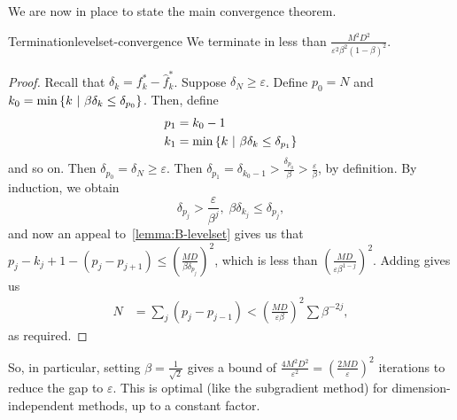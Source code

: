 We are now in place to state the main convergence theorem.
\begin{ctheorem}{Termination}{levelset-convergence}
	We terminate in less than $\frac{M^2 D^2}{\varepsilon^2 \beta^2 (1 -
	\beta)^2}$.
\end{ctheorem}
\begin{proof}
	Recall that $\delta_k = f_k^* - \hat{f}_k^*$.
	Suppose $\delta_N \geq \varepsilon$. Define $p_0 = N$ and
	$k_0 = \min\left\{ k \ \middle| \  \beta \delta_k \leq \delta_{p_0} \right\}$. Then, define
	\begin{align*}
		p_1 &= k_0 - 1 \\
		k_1 &= \min\left\{ k \ \middle| \  \beta \delta_k \leq \delta_{p_1} \right\}
	\end{align*}
	and so on. Then $\delta_{p_0} = \delta_N \geq \varepsilon$. Then
	$\delta_{p_1} = \delta_{k_0 - 1} > \frac{\delta_{p_0}}{\beta} >
	\frac{\varepsilon}{\beta}$, by definition. By induction, we obtain
	\[
		\delta_{p_j} > \frac{\varepsilon}{\beta^j}, \;
		\beta \delta_{k_j} \leq \delta_{p_j},
	\]
	and now an appeal to~\cref{lemma:B-levelset} gives us that
	$p_j - k_j + 1 - (p_j - p_{j+1}) \leq \left(\frac{M D}{\beta
			\delta_{p_j}}\right)^2$, which is less than $\left( \frac{MD}{\varepsilon
	\beta^{1-j}} \right)^2$. Adding gives us
	\begin{align*}
		N &= \sum_j \left(p_j - p_{j-1}\right) <
		\left(\frac{MD}{\varepsilon\beta}\right)^2 \sum \beta^{-2j},
	\end{align*}
	as required.
\end{proof}

So, in particular, setting $\beta = \frac{1}{\sqrt{2}}$ gives a bound of
$\frac{4 M^2 D^2}{\varepsilon^2} = \left(\frac{2 MD}{\varepsilon}\right)^2$
iterations to reduce the gap to $\varepsilon$. This is optimal (like the
subgradient method) for dimension-independent methods, up to a constant factor.
